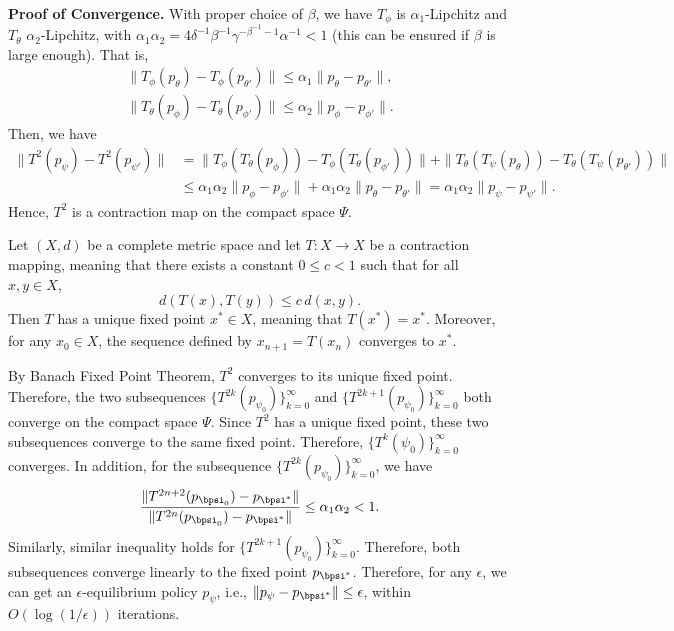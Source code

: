 \textbf{Proof of Convergence.} With proper choice of $\beta$, we have $T_\phi$ is $\alpha_1$-Lipchitz and $T_\theta$ $\alpha_2$-Lipchitz, with $\alpha_1 \alpha_2 = 4 \delta^{-1} \beta^{-1} \gamma^{-\beta^{-1}-1}  \alpha^{-1} < 1$ (this can be ensured if $\beta$ is large enough). That is,
\begin{align*}
    \| T_{\phi}(p_{\theta}) - T_{\phi}(p_{\theta'}) \| \le \alpha_1 \| p_\theta - p_{\theta'} \|, \\
    \| T_{\theta}(p_{\phi}) - T_{\theta}(p_{\phi'}) \| \le \alpha_2 \| p_\phi - p_{\phi'} \|.
\end{align*}
Then, we have
\begin{align*}
    \| T^2(p_{\psi}) - T^2(p_{\psi'}) \| & = \| T_\phi( T_\theta(p_{\phi})) - T_\phi( T_\theta(p_{\phi'})) \| + \| T_\theta( T_\psi(p_{\theta})) - T_\theta( T_\psi(p_{\theta'})) \|  \\ &\le \alpha_1\alpha_2 \| p_\phi - p_{\phi'} \| + \alpha_1 \alpha_2 \| p_\theta - p_{\theta'} \| = \alpha_1 \alpha_2 \| p_\psi - p_{\psi'} \|.
\end{align*}
Hence, $T^2$ is a contraction map on the compact space $\Psi$.
\begin{theorem}
    Let $(X, d)$ be a complete metric space and let $T: X \to X$ be a contraction mapping, meaning that there exists a constant $0 \leq c < 1$ such that for all $x, y \in X$,
\[
d(T(x), T(y)) \leq c \, d(x, y).
\]
Then $T$ has a unique fixed point $x^* \in X$, meaning that $T(x^*) = x^*$. Moreover, for any $x_0 \in X$, the sequence defined by $x_{n+1} = T(x_n) $ converges to $x^*$.
\end{theorem}
By Banach Fixed Point Theorem, $T^2$ converges to its unique fixed point. Therefore, the two subsequences $\{ T^{2k}(p_{\psi_0})\}_{k=0}^\infty$ and $\{ T^{2k+1}(p_{\psi_0})\}_{k=0}^\infty$ both converge on the compact space $\Psi$. Since $T^2$ has a unique fixed point, these two subsequences converge to the same fixed point. Therefore,  $\{ T^{k}(\psi_0)\}_{k=0}^\infty$ converges. In addition, for the subsequence $\{ T^{2k}(p_{\psi_0})\}_{k=0}^\infty$, we have
\begin{align*}
    \frac{\| T^{2n+2}(p_{\bpsi_0})- p_{\bpsi^*} \|}{\| T^{2n}(p_{\bpsi_0})- p_{\bpsi^*} \|} \le \alpha_1\alpha_2 < 1.
\end{align*}
Similarly, similar inequality holds for $\{ T^{2k+1}(p_{\psi_0})\}_{k=0}^\infty$. Therefore, both subsequences converge linearly to the fixed point $p_{\bpsi^*}$. Therefore, for any $\epsilon$, we can get an $\epsilon$-equilibrium policy $p_\psi$, i.e., $\| p_\psi - p_{\bpsi^*} \| \le \epsilon $, within $O(\log( 1 / \epsilon))$ iterations.

